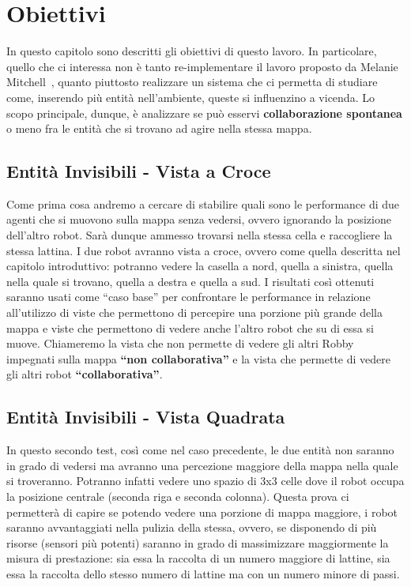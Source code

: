\chapter{Obiettivi}
In questo capitolo sono descritti gli obiettivi di questo lavoro. In
particolare, quello che ci interessa non è tanto re-implementare il lavoro
proposto da Melanie Mitchell~\cite{biblio:robby}, quanto piuttosto realizzare un
sistema che ci permetta di studiare come, inserendo più entità nell'ambiente,
queste si influenzino a vicenda.\newline
Lo scopo principale, dunque, è analizzare se può esservi \textbf{collaborazione
spontanea} o meno fra le entità che si trovano ad agire nella stessa mappa.



\section{Entità Invisibili - Vista a Croce}
Come prima cosa andremo a cercare di stabilire quali sono le performance di due
agenti che si muovono sulla mappa senza vedersi, ovvero ignorando la posizione
dell'altro robot. Sarà dunque ammesso trovarsi nella stessa cella e raccogliere
la stessa lattina.\newline
I due robot avranno vista a croce, ovvero come quella descritta nel capitolo
introduttivo: potranno vedere la casella a nord, quella a sinistra, quella nella
quale si trovano, quella a destra e quella a sud.\newline
I risultati così ottenuti saranno usati come ``caso base'' per confrontare le
performance in relazione all'utilizzo di viste che permettono di percepire una
porzione più grande della mappa e viste che permettono di vedere anche l'altro
robot che su di essa si muove.\newline
Chiameremo la vista che non permette di vedere gli altri Robby impegnati sulla
mappa \textbf{``non collaborativa''} e la vista che permette di vedere gli altri
robot \textbf{``collaborativa''}.



\section{Entità Invisibili - Vista Quadrata}
In questo secondo test, così come nel caso precedente, le due entità non saranno
in grado di vedersi ma avranno una percezione maggiore della mappa nella quale
si troveranno. Potranno infatti vedere uno spazio di 3x3 celle dove il robot
occupa la posizione centrale (seconda riga e seconda colonna).\newline
Questa prova ci permetterà di capire se potendo vedere una porzione di mappa
maggiore, i robot saranno avvantaggiati nella pulizia della stessa, ovvero, se
disponendo di più risorse (sensori più potenti) saranno in grado di massimizzare
maggiormente la misura di prestazione: sia essa la raccolta di un numero
maggiore di lattine, sia essa la raccolta dello stesso numero di lattine ma con
un numero minore di passi.



